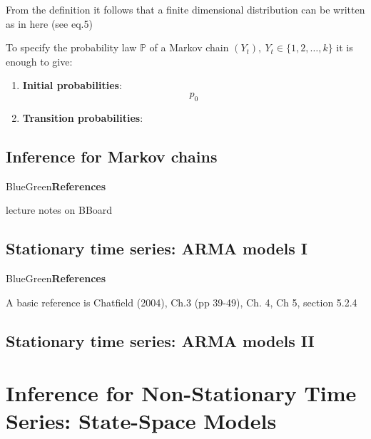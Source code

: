 \documentclass[dvipsnames,12pt]{book}
\begin{document}
            \begin{definition}
                
            \end{definition}

            From the definition it follows that a finite dimensional distribution can be written as in here (see eq.5)

            \noindent To specify the probability law \(\mathbb{P}\) of a Markov chain \((Y_t), \ Y_t \in \{ 1,2, \ldots, k \}\) it is enough to give:
                \begin{enumerate}[label=\roman*.]
                    \item \textbf{Initial probabilities}:
                        \[
                        p_0 
                        \]
                    \item \textbf{Transition probabilities}:
                \end{enumerate}

    \chapter{Inference for Markov chains}

            \begin{mybox}{BlueGreen}{\textbf{References}}

                lecture notes on BBoard
                
            \end{mybox}

    \chapter{Stationary time series: ARMA models I}

            \begin{mybox}{BlueGreen}{\textbf{References}}

                A basic reference is Chatfield (2004), Ch.3 (pp 39-49), Ch. 4, Ch 5, section 5.2.4
                
            \end{mybox}

    \chapter{Stationary time series: ARMA models II}
    
\part[Inference for Non-Stationary Time Series]{Inference for Non-Stationary Time Series: State-Space Models}
\end{document}
